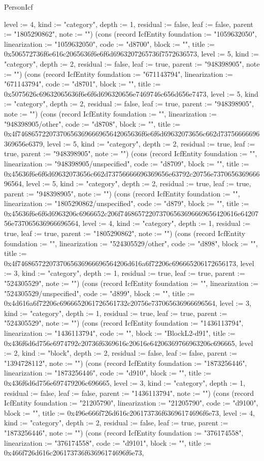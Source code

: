 \begin{lexlean}{PersonIcf}
\begin{semanticmodule}
{level := 4, kind := "category", depth := 1, residual := false, leaf := false, parent := "1805290862", note := ""}) (cons (record IcfEntity {foundation := "1059632050", linearization := "1059632050", code := "d8700", block := "", title := 0x506572736f6e616c2065636f6e6f6d6963207265736f7572636573, level := 5, kind := "category", depth := 2, residual := false, leaf := true, parent := "948398905", note := ""}) (cons (record IcfEntity {foundation := "671143794", linearization := "671143794", code := "d8701", block := "", title := 0x5075626c69632065636f6e6f6d696320656e7469746c656d656e7473, level := 5, kind := "category", depth := 2, residual := false, leaf := true, parent := "948398905", note := ""}) (cons (record IcfEntity {foundation := "", linearization := "948398905/other", code := "d8708", block := "", title := 0x4f74686572207370656369666965642065636f6e6f6d69632073656c662d73756666696369656e6379, level := 5, kind := "category", depth := 2, residual := true, leaf := true, parent := "948398905", note := ""}) (cons (record IcfEntity {foundation := "", linearization := "948398905/unspecified", code := "d8709", block := "", title := 0x45636f6e6f6d69632073656c662d73756666696369656e63792c20756e737065636966696564, level := 5, kind := "category", depth := 2, residual := true, leaf := true, parent := "948398905", note := ""}) (cons (record IcfEntity {foundation := "", linearization := "1805290862/unspecified", code := "d879", block := "", title := 0x45636f6e6f6d6963206c6966652c206f746865722073706563696669656420616e6420756e737065636966696564, level := 4, kind := "category", depth := 1, residual := true, leaf := true, parent := "1805290862", note := ""}) (cons (record IcfEntity {foundation := "", linearization := "524305529/other", code := "d898", block := "", title := 0x4f7468657220737065636966696564206d616a6f72206c696665206172656173, level := 3, kind := "category", depth := 1, residual := true, leaf := true, parent := "524305529", note := ""}) (cons (record IcfEntity {foundation := "", linearization := "524305529/unspecified", code := "d899", block := "", title := 0x4d616a6f72206c6966652061726561732c20756e737065636966696564, level := 3, kind := "category", depth := 1, residual := true, leaf := true, parent := "524305529", note := ""}) (cons (record IcfEntity {foundation := "1436113794", linearization := "1436113794", code := "", block := "BlockL2-d91", title := 0x436f6d6d756e6974792c20736f6369616c20616e64206369766963206c696665, level := 2, kind := "block", depth := 2, residual := false, leaf := false, parent := "1394728112", note := ""}) (cons (record IcfEntity {foundation := "1873256446", linearization := "1873256446", code := "d910", block := "", title := 0x436f6d6d756e697479206c696665, level := 3, kind := "category", depth := 1, residual := false, leaf := false, parent := "1436113794", note := ""}) (cons (record IcfEntity {foundation := "21205790", linearization := "21205790", code := "d9100", block := "", title := 0x496e666f726d616c206173736f63696174696f6e73, level := 4, kind := "category", depth := 2, residual := false, leaf := true, parent := "1873256446", note := ""}) (cons (record IcfEntity {foundation := "376174558", linearization := "376174558", code := "d9101", block := "", title := 0x466f726d616c206173736f63696174696f6e73, }
\end{semanticmodule}
\end{lexlean}
